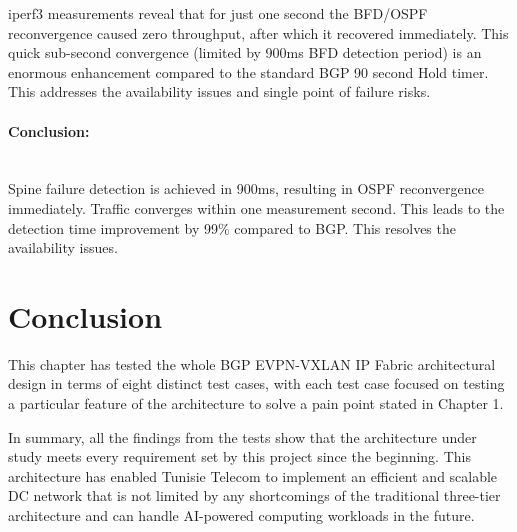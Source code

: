 iperf3 measurements reveal that for just one second the BFD/OSPF reconvergence caused zero throughput, after which it recovered immediately. This quick sub-second convergence (limited by 900ms BFD detection period) is an enormous enhancement compared to the standard BGP 90 second Hold timer. This addresses the availability issues and single point of failure risks.

\paragraph{Conclusion:}~\\
Spine failure detection is achieved in 900ms, resulting in OSPF reconvergence immediately. Traffic converges within one measurement second. This leads to the detection time improvement by 99\% compared to BGP. This resolves the availability issues.

\section{Conclusion}
This chapter has tested the whole BGP EVPN-VXLAN IP Fabric architectural design in terms of eight distinct test cases, with each test case focused on testing a particular feature of the architecture to solve a pain point stated in Chapter 1.

In summary, all the findings from the tests show that the architecture under study meets every requirement set by this project since the beginning. This architecture has enabled Tunisie Telecom to implement an efficient and scalable DC network that is not limited by any shortcomings of the traditional three-tier architecture and can handle AI-powered computing workloads in the future.